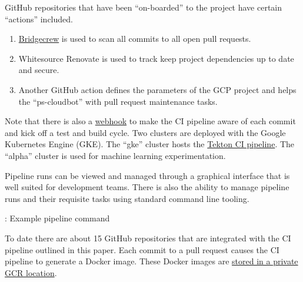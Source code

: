 \justifying
GitHub repositories that have been ``on-boarded'' to the project have certain ``actions'' included.

\begin{raggedright}
	\begin{enumerate}
		\item \href{https://docs.bridgecrew.io/docs}{Bridgecrew} is used to scan all commits to all open pull requests.
		\item Whitesource Renovate is used to track keep project dependencies up to date and secure.
		\item Another GitHub action defines the parameters of the GCP project and helps the ``ps-cloudbot'' with pull request  maintenance tasks.
	\end{enumerate}
\end{raggedright}
\vspace{2mm}


\justifying
Note that there is also a \href{https://docs.github.com/en/developers/webhooks-and-events/webhooks/about-webhooks}{webhook} to make the CI pipeline
aware of each commit and kick off a test and build cycle.
\vspace{2mm}
\justifying
{}
\vspace{2mm}
\justifying
Two clusters are deployed with the Google Kubernetes Engine (GKE). The ``gke'' cluster hosts the \href{https://tekton.dev/}{Tekton CI pipeline}.
The ``alpha'' cluster is used for machine learning experimentation.


\justifying
Pipeline runs can be viewed and managed through a graphical interface that is well suited for development teams. There is
also the ability to manage pipeline runs and their requisite tasks using standard command line tooling.

\begin{mybox}{\thetcbcounter: Example pipeline command}
	
\end{mybox}
\vspace{2mm}

\vspace{2mm}

\justifying
To date there are about 15 GitHub repositories that are integrated with the CI pipeline outlined in this paper. Each commit
to a pull request causes the CI pipeline to generate a Docker image. These Docker images
are \href{https://cloud.google.com/container-registry/}{stored in a private GCR location}.
\vspace{2mm}

